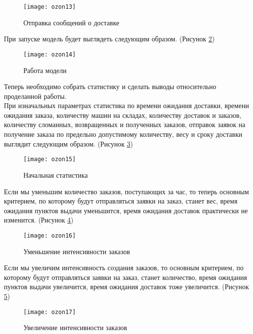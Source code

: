 \begin{figure}[h]
	\centering \texttt{[image: ozon13]}
	\caption{Отправка сообщений о доставке}
	\label{fig:ozon13}
\end{figure}

\newpage

При запуске модель будет выглядеть следующим образом. (Рисунок \ref{fig:ozon14})

\begin{figure}[h]
	\centering \texttt{[image: ozon14]}
	\caption{Работа модели}
	\label{fig:ozon14}
\end{figure}

Теперь необходимо собрать статистику и сделать выводы относительно проделанной работы.\\

При изначальных параметрах статистика по времени ожидания доставки, времени ожидания заказа, количеству машин на складах, количеству доставок и заказов, количеству сломанных, возвращенных и полученных заказов, отправок заявок на получение заказа по предельно допустимому количеству, весу и сроку доставки выглядит следующим образом. (Рисунок \ref{fig:ozon15})

\begin{figure}[h]
	\centering \texttt{[image: ozon15]}
	\caption{Начальная статистика}
	\label{fig:ozon15}
\end{figure}

\newpage

Если мы уменьшим количество заказов, поступающих за час, то  теперь основным критерием, по которому будут отправляться заявки на заказ, станет вес, время ожидания пунктов выдачи уменьшится, время ожидания  доставок практически не изменится. (Рисунок \ref{fig:ozon16})

\begin{figure}[h]
	\centering \texttt{[image: ozon16]}
	\caption{Уменьшение интенсивности заказов}
	\label{fig:ozon16}
\end{figure}

Если мы увеличим интенсивность создания заказов, то основным критерием, по которому будут отправляться заявки на заказ, станет количество, время ожидания пунктов выдачи увеличится, время ожидания  доставок тоже увеличится. (Рисунок \ref{fig:ozon17})

\begin{figure}[h]
	\centering \texttt{[image: ozon17]}
	\caption{Увеличение интенсивности заказов}
	\label{fig:ozon17}
\end{figure}

